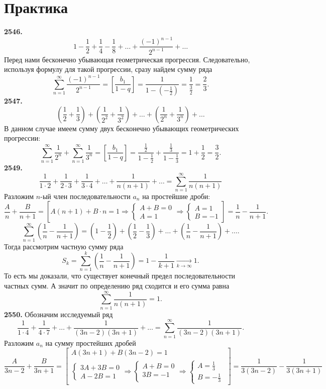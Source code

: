 \documentclass[a4paper, 12pt]{report}
\numberwithin{equation}{section}
\begin{document}
	\section*{Практика}
	\textbf{2546.}
	$$1 - \frac{1}{2} + \frac{1}{4} - \frac{1}{8} + \dots + \frac{(-1)^{n-1}}{2^{n-1}} + \dots$$ Перед нами бесконечно убывающая геометрическая прогрессия. Следовательно, используя формулу для такой прогрессии, сразу найдем сумму ряда
	$$\sum_{n=1}^{\infty} \frac{(-1)^{n-1}}{2^{n-1}} = \left[ \frac{b_1}{1-q} \right] = \frac{1}{1 - \left(-\frac{1}{2}\right)} = \frac{1}{\frac{3}{2}} = \frac{2}{3}.$$
	\textbf{2547.}
	$$\left(\frac{1}{2} + \frac{1}{3}\right) + \left(\frac{1}{2^2} + \frac{1}{3^2}\right) + \dots + \left(\frac{1}{2^n} + \frac{1}{3^n}\right) + \dots$$ 
	В данном случае имеем сумму двух бесконечно убывающих геометрических прогрессии:
	$$\sum_{n=1}^{\infty} \frac{1}{2^n} + \sum_{n=1}^{\infty} \frac{1}{3^n} = \left[ \frac{b_1}{1-q} \right] = \frac{\frac{1}{2}}{1-\frac{1}{2}} + \frac{\frac{1}{3}}{1-\frac{1}{3}} = 1 + \frac{1}{2} = \frac{3}{2}.$$
	\textbf{2549.}$$
	\frac{1}{1 \cdot 2} + \frac{1}{2 \cdot 3} + \frac{1}{3 \cdot 4} + \dots + \frac{1}{n(n+1)} + \dots = \sum_{n=1}^{\infty} \frac{1}{n(n+1)}
	$$
	Разложим $n$-ый член последовательности $a_n$ на простейшие дроби:
	$$\dfrac{A}{n} + \dfrac{B}{n+1} = \left[ A(n+1) + B \cdot n = 1 \Rightarrow \begin{cases} A+B=0 \\ A=1 \end{cases} \Rightarrow \begin{cases} A=1 \\ B=-1 \end{cases} \right] = \frac{1}{n} - \frac{1}{n+1}.
	$$ 
	$$\sum_{n=1}^{\infty} \left( \frac{1}{n} - \frac{1}{n+1} \right) = \left(1 - \frac{1}{2}\right)+\left(\frac{1}{2}-\frac{1}{3}\right)+\dots+\left(\frac{1}{n}-\frac{1}{n+1}\right) + \dots.
	$$ 
	Тогда рассмотрим частную сумму ряда
	$$
	S_k = \sum_{n=1}^{k} \left( \frac{1}{n} - \frac{1}{n+1} \right) = 1 - \frac{1}{k+1} \xrightarrow[k \to \infty]{} 1.
	$$ 
	То есть мы доказали, что существует конечный предел последовательности частных сумм. А значит по определению ряд сходится и его сумма равна 
	$$\sum_{n=1}^{\infty} \frac{1}{n(n+1)} = 1.$$
	\textbf{2550.}
	Обозначим исследуемый ряд
	$$\dfrac{1}{1\cdot 4} + \dfrac{1}{4\cdot 7} + \ldots + \frac{1}{(3n-2)(3n+1)} + \ldots = \sum_{n=1}^{\infty} \frac{1}{(3n-2)(3n+1)}.$$
	Разложим $a_n$ на сумму простейших дробей
	$$ \frac{A}{3n-2}+\frac{B}{3n+1} = \left[ \begin{gathered} A(3n+1) + B(3n-2) = 1 \\ \begin{cases} 3A+3B=0 \\ A-2B=1 \end{cases} \Rightarrow \begin{cases} A+B=0 \\ 3B=-1 \\ \end{cases} \Rightarrow \begin{cases} A=\frac{1}{3} \\ B=-\frac{1}{3} \end{cases} \end{gathered} \right] = \frac{1}{3(3n-2)} - \frac{1}{3(3n+1)} $$
\end{document}
